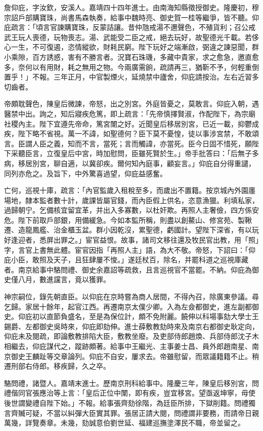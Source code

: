 \begin{pinyinscope}
{{詹仰庇，字汝欽，安溪人。嘉靖四十四年進士。由南海知縣徵授御史。隆慶初，穆宗詔戶部購寶珠，尚書馬森執奏，給事中魏時亮、御史賀一桂等繼爭，皆不聽。仰庇疏言：「頃言官諫購寶珠，反蒙詰讓。昔仲虺戒湯不邇聲色，不殖貨利；召公戒武王玩人喪德，玩物喪志。湯、武能受二臣之戒，絕去玩好，故聖德光千載。若侈心一生，不可復遏，恣情縱欲，財耗民窮。陛下玩好之端漸啟，弼違之諫惡聞，群小乘隙，百方誘惑，害有不勝言者。況寶石珠璣，多藏中貴家，求之愈急，邀直愈多，奈何以有用財，耗之無用之物。今兩廣需餉，疏請再三，猶靳不予，何輕重倒置乎！」不報。三年正月，中官製煙火，延燒禁中廬舍，仰庇請按治。左右近習多切齒者。

帝頗耽聲色，陳皇后微諫，帝怒，出之別宮。外庭皆憂之，莫敢言。仰庇入朝，遇醫禁中出。詢之，知后寢疾危篤，即上疏言：「先帝慎擇賢淑，作配陛下，為宗廟社稷內主。陛下宜遵先帝命，篤宮闈之好。近聞皇后移居別宮，已近一載，抑鬱成疾，陛下略不省視。萬一不諱，如聖德何？臣下莫不憂惶，徒以事涉宮禁，不敢頌言。臣謂人臣之義，知而不言，當死；言而觸諱，亦當死。臣今日固不惜死，願陛下采聽臣言，立復皇后中宮，時加慰問，臣雖死賢於生。」帝手批答曰：「后無子多病，移居別宮，聊自適，以冀卻疾。爾何知內庭事，顧妄言。」仰庇自分得重譴，同列亦危之。及旨下，中外驚喜過望，仰庇益感奮。

亡何，巡視十庫，疏言：「內官監歲入租稅至多，而歲出不置籍。按京城內外園廛場地，隸本監者數十計，歲課皆屬官錢，而內臣假上供名，恣意漁獵。利填私家，過歸朝宁。乞備核宜留宜革，并出入多寡數，以杜奸欺。再照人主奢儉，四方係安危。陛下前取戶部銀，用備緩急。今如本監所稱，則盡以創鰲山、修宮苑、製鞦遷、造龍鳳艦、治金櫃玉盆。群小因乾沒，累聖德，虧國計。望陛下深省，有以玩好逢迎者，悉屏出罪之。」宦官益恨。故事，諸司文移往還及牧民官出教，用「照」字，言官上書無此體。宦官因指「再照人主」語，為大不敬。帝怒，下詔曰：「仰庇小臣，敢照及天子，且狂肆屢不悛。」遂廷杖百，除名，并罷科道之巡視庫藏者。南京給事中駱問禮、御史余嘉詔等疏救，且言巡視官不當罷。不納。仰庇為御史僅八月，數進讜言，竟以獲罪。

神宗嗣位，錄先朝直臣。以仰庇在京時嘗為商人居間，不得內召，除廣東參議。尋乞歸。家居十餘年，起官江西。再遷南京太僕少卿。入為左僉都御史，進左副都御史。仰庇初以直節負盛名，至是為保位計，頗不免附麗。饒伸以科場事劾大學士王錫爵、左都御史吳時來，仰庇即劾伸。進士薛敷教劾時來及南京右都御史耿定向，仰庇未及閱疏，即論敷教排陷大臣，敷教坐廢。及吏部侍郎趙煥、兵部侍郎沈子木相繼去，仰庇謀代之，蹤跡頗著。給事中王繼光、主事姜士昌、員外郎趙南星、南京御史王麟趾等交章論列。仰庇不自安，屢求去。帝雖慰留，而眾議籍籍不止。稍遷刑部右侍郎。移疾歸，久之卒。

駱問禮，諸暨人。嘉靖末進士。歷南京刑科給事中。隆慶三年，陳皇后移別宮，問禮偕同官張應治等上言：「皇后正位中闈，即有疾，豈宜移宮。望亟返坤寧，毋使後世謂變禮自陛下始。」不報。給事張齊劾徐階，為廷臣所排，下獄削籍。問禮獨言齊贓可疑，不當以糾彈大臣實其罪。張居正請大閱，問禮謂非要務，而請帝日親萬幾，詳覽奏章。未幾，劾誠意伯劉世延、福建巡撫塗澤民不職，帝並留之。

}}
\end{pinyinscope}
